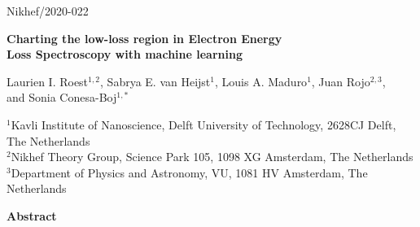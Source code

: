 \documentclass[12pt,a4paper]{article}
\numberwithin{equation}{section}
\numberwithin{figure}{section}
\numberwithin{table}{section}
\begin{document}





\begin{flushright}
Nikhef/2020-022\\
\end{flushright}
\vspace{0.3cm}

\begin{center}
  {\Large \bf Charting the low-loss region in Electron Energy \\[0.3cm] Loss Spectroscopy with machine learning}
\vspace{1.4cm}

Laurien I. Roest$^{1,2}$, Sabrya E. van Heijst$^{1}$,
  Louis A. Maduro$^{1}$,
  Juan Rojo$^{2,3}$,\\[0.2cm] and Sonia Conesa-Boj$^{1,*}$

\vspace{1.0cm}
 
{\it \small

$^{1}$Kavli Institute of Nanoscience, Delft University of Technology, 2628CJ Delft, The
  Netherlands\\[0.1cm]
$^{2}$Nikhef Theory Group, Science Park 105, 1098 XG Amsterdam, The
  Netherlands \\[0.1cm]$^{3}$Department of Physics and Astronomy, VU,
    1081 HV Amsterdam, The Netherlands

}

\vspace{1.0cm}

{\bf \large Abstract}

\end{center}
\end{document}

